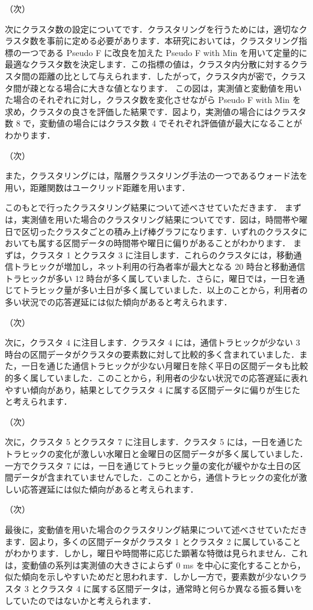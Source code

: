 \documentclass[a4j]{jarticle}
\begin{document}
（次）

次にクラスタ数の設定についてです．クラスタリングを行うためには，適切なクラスタ数を事前に定める必要があります．本研究においては，クラスタリング指標の一つである Pseudo F に改良を加えた Pseudo F with Min を用いて定量的に最適なクラスタ数を決定します．この指標の値は，クラスタ内分散に対するクラスタ間の距離の比として与えられます．したがって，クラスタ内が密で，クラスタ間が疎となる場合に大きな値となります．
この図は，実測値と変動値を用いた場合のそれぞれに対し，クラスタ数を変化させながら Pseudo F with Min を求め，クラスタの良さを評価した結果です．図より，実測値の場合にはクラスタ数 8 で，変動値の場合にはクラスタ数 4 でそれぞれ評価値が最大になることがわかります．

（次）

また，クラスタリングには，階層クラスタリング手法の一つであるウォード法を用い，距離関数はユークリッド距離を用います．

このもとで行ったクラスタリング結果について述べさせていただきます．
まずは，実測値を用いた場合のクラスタリング結果についてです．図は，時間帯や曜日で区切ったクラスタごとの積み上げ棒グラフになります．いずれのクラスタにおいても属する区間データの時間帯や曜日に偏りがあることがわかります．
まずは，クラスタ 1 とクラスタ 3 に注目します．これらのクラスタには，移動通信トラヒックが増加し，ネット利用の行為者率が最大となる 20 時台と移動通信トラヒックが多い 12 時台が多く属していました．さらに，曜日では，一日を通じてトラヒック量が多い土日が多く属していました．以上のことから，利用者の多い状況での応答遅延には似た傾向があると考えられます．

（次）

次に，クラスタ 4 に注目します．クラスタ 4 には，通信トラヒックが少ない 3 時台の区間データがクラスタの要素数に対して比較的多く含まれていました．また，一日を通じた通信トラヒックが少ない月曜日を除く平日の区間データも比較的多く属していました．このことから，利用者の少ない状況での応答遅延に表れやすい傾向があり，結果としてクラスタ 4 に属する区間データに偏りが生じたと考えられます．

（次）

次に，クラスタ 5 とクラスタ 7 に注目します．クラスタ 5 には，一日を通じたトラヒックの変化が激しい水曜日と金曜日の区間データが多く属していました．一方でクラスタ 7 には，一日を通じてトラヒック量の変化が緩やかな土日の区間データが含まれていませんでした．このことから，通信トラヒックの変化が激しい応答遅延には似た傾向があると考えられます．

（次）

最後に，変動値を用いた場合のクラスタリング結果について述べさせていただきます．図より，多くの区間データがクラスタ 1 とクラスタ 2 に属していることがわかります．しかし，曜日や時間帯に応じた顕著な特徴は見られません．これは，変動値の系列は実測値の大きさによらず 0 ms を中心に変化することから，似た傾向を示しやすいためだと思われます．しかし一方で，要素数が少ないクラスタ 3 とクラスタ 4 に属する区間データは，通常時と何らか異なる振る舞いをしていたのではないかと考えられます．
\end{document}
